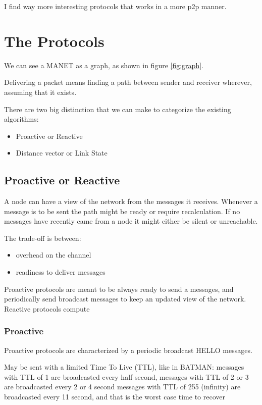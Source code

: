 \documentclass{article}
\begin{document}
I find way more interesting protocols that works in a more p2p manner.

\section{The Protocols}


We can see a MANET as a graph, as shown in figure \ref{fig:graph}.


Delivering a packet means finding a path between sender and receiver wherever, assuming that it exists.

There are two big distinction that we can make to categorize the existing algorithms:

\begin{itemize}
    \item Proactive or Reactive
    \item Distance vector or Link State
\end{itemize}{}

\subsection{Proactive or Reactive}

A node can have a view of the network from the messages it receives. Whenever a message is to be sent the path might be ready or require recalculation.
If no messages have recently came from a node it might either be silent or unreachable.

The trade-off is between:
\begin{itemize}
    \item overhead on the channel
    \item readiness to deliver messages
\end{itemize}{}

Proactive protocols are meant to be always ready to send a messages, and periodically send broadcast messages to keep an updated view of the network.
Reactive protocols compute 

\subsubsection{Proactive}
Proactive protocols are characterized by a periodic broadcast HELLO messages.

May be sent with a limited Time To Live (TTL), like in BATMAN:
messages with TTL of 1 are broadcasted every half second,
messages with TTL of 2 or 3 are broadcasted every 2 or 4 second
messages with TTL of 255 (infinity) are broadcasted every 11 second, and that is the worst case time to recover 
\end{document}
